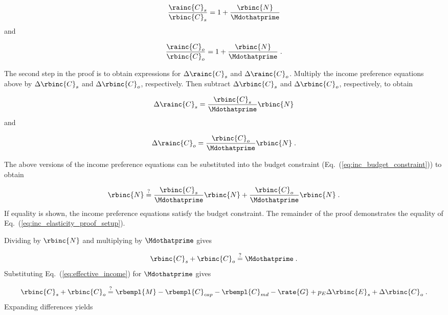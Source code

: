 \begin{equation}
    \frac{\rainc{C}_s}{\rbinc{C}_s} = 1 + \frac{\rbinc{N}}{\Mdothatprime}
\end{equation}
%
and

\begin{equation}
  \frac{\rainc{C}_o}{\rbinc{C}_o} = 1 + \frac{\rbinc{N}}{\Mdothatprime} \; .
\end{equation}
%

The second step in the proof is to obtain expressions 
for $\Delta \rainc{C}_s$ and $\Delta \rainc{C}_o$.
Multiply the income preference equations above
by $\Delta \rbinc{C}_s$ and $\Delta \rbinc{C}_o$, respectively.
Then subtract $\Delta \rbinc{C}_s$ and $\Delta \rbinc{C}_o$, respectively, 
to obtain

\begin{equation}
  \Delta \rainc{C}_s = \frac{\rbinc{C}_s}{\Mdothatprime} \rbinc{N}
\end{equation}
%
and

\begin{equation}
  \Delta \rainc{C}_o = \frac{\rbinc{C}_o}{\Mdothatprime} \rbinc{N} \; .
\end{equation}

The above versions of the income preference equations 
can be substituted into the budget constraint
(Eq.~(\ref{eq:inc_budget_constraint})) to obtain

\begin{equation} \label{eq:inc_elasticity_proof_setup}
  \rbinc{N} \stackrel{?}{=} \frac{\rbinc{C}_s}{\Mdothatprime} \rbinc{N} 
                            + \frac{\rbinc{C}_o}{\Mdothatprime}  \rbinc{N} \; .
\end{equation}
%
If equality is shown, 
the income preference equations satisfy the budget constraint.
The remainder of the proof demonstrates the equality
of Eq.~(\ref{eq:inc_elasticity_proof_setup}).

Dividing by $\rbinc{N}$ and multiplying by $\Mdothatprime$ gives

\begin{equation}
  \rbinc{C}_s + \rbinc{C}_o \stackrel{?}{=} \Mdothatprime \; .
\end{equation}
%
Substituting Eq.~(\ref{eq:effective_income}) for $\Mdothatprime$ gives

\begin{equation}
  \rbinc{C}_s + \rbinc{C}_o \stackrel{?}{=} \rbempl{M} - \rbempl{C}_{cap} - \rbempl{C}_{md} 
                       - \rate{G} + p_E \Delta \rbinc{E}_s + \Delta \rbinc{C}_o \; .
\end{equation}
%
Expanding differences yields

